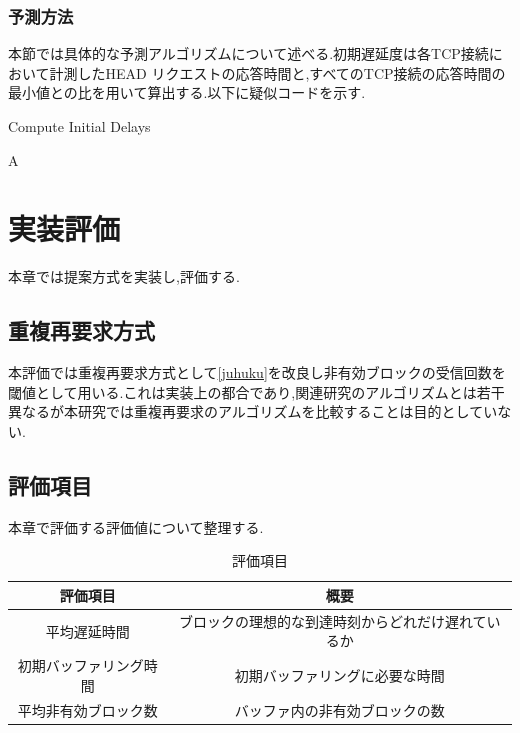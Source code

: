 \documentclass[a4j,12pt]{gradthesis_utf8}
\begin{document}
\subsection{予測方法}
\label{yosokuhouhou}
本節では具体的な予測アルゴリズムについて述べる.初期遅延度は各TCP接続において計測したHEAD リクエストの応答時間と,すべてのTCP接続の応答時間の最小値との比を用いて算出する.以下に疑似コードを示す.

\begin{algorithm}
	\caption{Compute Initial Delays}
	\begin{algorithmic}[1]
		A
		\EndFor
	\end{algorithmic}
	
\end{algorithm}


\chapter{実装評価}\label{sec:sec4}

本章では提案方式を実装し,評価する.

\section{重複再要求方式}
本評価では重複再要求方式として\ref{juhuku}を改良し非有効ブロックの受信回数を閾値として用いる.これは実装上の都合であり,関連研究のアルゴリズムとは若干異なるが本研究では重複再要求のアルゴリズムを比較することは目的としていない.

\section{評価項目}
\label{hyoukakoumoku}
本章で評価する評価値について整理する.
\begin{table}[htb]
	\begin{center}
		\caption{評価項目}
		\begin{tabular}{|c|c|} \hline
			評価項目 & 概要　\\ \hline \hline
			平均遅延時間 & ブロックの理想的な到達時刻からどれだけ遅れているか\\ \hline
			初期バッファリング時間 & 初期バッファリングに必要な時間 \\ \hline
			平均非有効ブロック数 & バッファ内の非有効ブロックの数 \\ \hline
			
		\end{tabular}
	\end{center}
\end{table}
\end{document}
